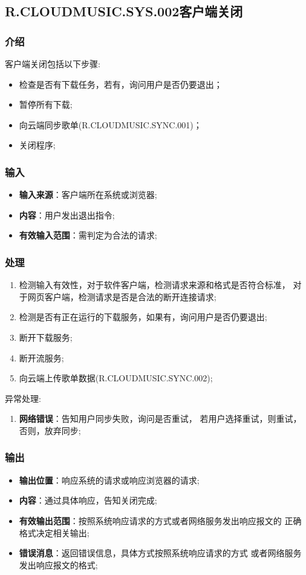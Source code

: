 \subsection{R.CLOUDMUSIC.SYS.002客户端关闭}
\subsubsection{介绍}
客户端关闭包括以下步骤:
	\begin{itemize}
		\item 检查是否有下载任务，若有，询问用户是否仍要退出；
		\item 暂停所有下载;
		\item 向云端同步歌单(R.CLOUDMUSIC.SYNC.001)；
		\item 关闭程序;
	\end{itemize}
\subsubsection{输入}
	\begin{itemize}
		\item \textbf{输入来源}：客户端所在系统或浏览器;
		\item \textbf{内容}：用户发出退出指令;
		\item \textbf{有效输入范围}：需判定为合法的请求;
	\end{itemize}
\subsubsection{处理}
	\begin{enumerate}
		\item 检测输入有效性，对于软件客户端，检测请求来源和格式是否符合标准，
			对于网页客户端，检测请求是否是合法的断开连接请求;
		\item 检测是否有正在运行的下载服务，如果有，询问用户是否仍要退出;
		\item 断开下载服务;
		\item 断开流服务;
		\item 向云端上传歌单数据(R.CLOUDMUSIC.SYNC.002);
	\end{enumerate}
	\noindent 异常处理:
	\begin{enumerate}
		\item \textbf{网络错误}：告知用户同步失败，询问是否重试，
			若用户选择重试，则重试，否则，放弃同步;
	\end{enumerate}
\subsubsection{输出}
\begin{itemize}
	\item \textbf{输出位置}：响应系统的请求或响应浏览器的请求;
	\item \textbf{内容}：通过具体响应，告知关闭完成;
	\item \textbf{有效输出范围}：按照系统响应请求的方式或者网络服务发出响应报文的
		正确格式决定相关输出;
	\item \textbf{错误消息}：返回错误信息，具体方式按照系统响应请求的方式
		或者网络服务发出响应报文的格式;
\end{itemize}

